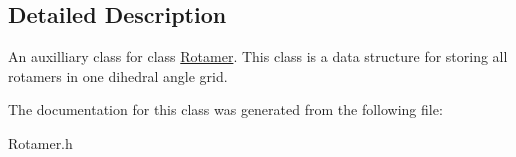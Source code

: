 \subsection{Detailed Description}
An auxilliary class for class \hyperlink{classRotamer}{Rotamer}. This class is a data structure for storing all rotamers in one dihedral angle grid. 

The documentation for this class was generated from the following file\-:\begin{DoxyCompactItemize}
\item 
Rotamer.\-h\end{DoxyCompactItemize}
